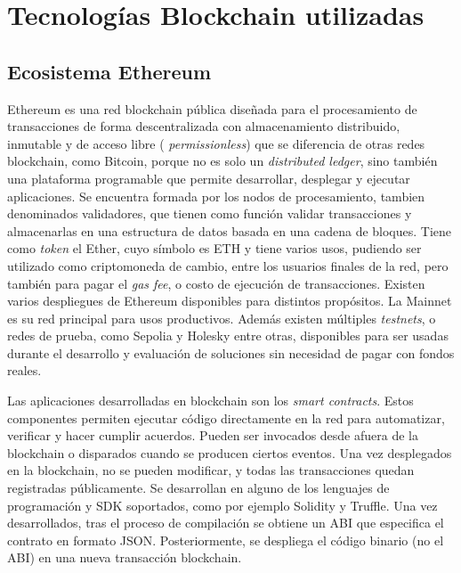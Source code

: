 \section{Tecnologías Blockchain utilizadas}


\subsection{Ecosistema Ethereum}

Ethereum \citep{ethereum} es una red blockchain pública diseñada para el procesamiento de transacciones de forma descentralizada con almacenamiento distribuido, inmutable y de acceso libre ( \textit{permissionless}) que se diferencia de otras redes blockchain, como Bitcoin, porque no es solo un \textit{distributed ledger}, sino también una plataforma programable que permite desarrollar, desplegar y ejecutar aplicaciones. Se encuentra formada por los nodos de procesamiento, tambien denominados validadores, que tienen como función validar transacciones y almacenarlas en una estructura de datos basada en una cadena de bloques. Tiene como \textit{token} el Ether, cuyo símbolo es ETH y tiene varios usos, pudiendo ser utilizado como criptomoneda de cambio, entre los usuarios finales de la red, pero también para pagar el \textit{gas fee}, o costo de ejecución de transacciones. 
Existen varios despliegues de Ethereum disponibles para distintos propósitos. La Mainnet \citep{mainnet} es su red principal para usos productivos. Además existen múltiples \textit{testnets}, o redes de prueba, como Sepolia \citep{sepolia} y Holesky \citep{holesky} entre otras, disponibles para ser usadas durante el desarrollo y evaluación de soluciones sin necesidad de pagar con fondos reales. 


Las aplicaciones desarrolladas en blockchain son los \textit{smart contracts}. Estos componentes permiten ejecutar código directamente en la red para automatizar, verificar y hacer cumplir acuerdos. Pueden ser invocados desde afuera de la blockchain o disparados cuando se producen ciertos eventos. Una vez desplegados en la blockchain, no se pueden modificar, y todas las transacciones quedan registradas públicamente. 
Se desarrollan en alguno de los lenguajes de programación y SDK soportados, como por ejemplo Solidity y Truffle. Una vez desarrollados, tras el proceso de compilación se obtiene un ABI \citep{abi} que especifica el contrato en formato JSON. Posteriormente, se despliega el código binario (no el ABI) en una nueva transacción blockchain. 

